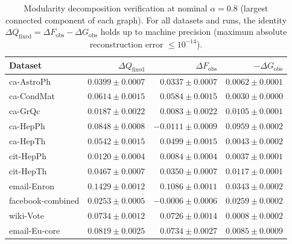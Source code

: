 \begin{table}[t]
\centering
\caption{Modularity decomposition verification at nominal $\alpha = 0.8$ (largest connected component of each graph).
For all datasets and runs, the identity $\Delta Q_{\mathrm{fixed}} = \Delta F_{\mathrm{obs}} - \Delta G_{\mathrm{obs}}$ holds up to machine precision (maximum absolute reconstruction error $\le 10^{-14}$).}
\label{tab:exp1_2_decomposition}
\begin{tabular}{lrrr}
\toprule
Dataset & $\Delta Q_{\mathrm{fixed}}$ & $\Delta F_{\mathrm{obs}}$ & $-\Delta G_{\mathrm{obs}}$  \\
\midrule
ca-AstroPh & $0.0399 \pm 0.0007$ & $0.0337 \pm 0.0007$ & $0.0062 \pm 0.0001$ \\
ca-CondMat & $0.0614 \pm 0.0015$ & $0.0584 \pm 0.0015$ & $0.0030 \pm 0.0000$ \\
ca-GrQc & $0.0187 \pm 0.0022$ & $0.0083 \pm 0.0022$ & $0.0105 \pm 0.0001$ \\
ca-HepPh & $0.0848 \pm 0.0008$ & $-0.0111 \pm 0.0009$ & $0.0959 \pm 0.0002$ \\
ca-HepTh & $0.0542 \pm 0.0015$ & $0.0499 \pm 0.0015$ & $0.0043 \pm 0.0002$ \\
cit-HepPh & $0.0120 \pm 0.0004$ & $0.0084 \pm 0.0004$ & $0.0037 \pm 0.0001$ \\
cit-HepTh & $0.0467 \pm 0.0007$ & $0.0350 \pm 0.0007$ & $0.0117 \pm 0.0001$ \\
email-Enron & $0.1429 \pm 0.0012$ & $0.1086 \pm 0.0011$ & $0.0343 \pm 0.0002$ \\
facebook-combined & $0.0253 \pm 0.0005$ & $-0.0006 \pm 0.0006$ & $0.0259 \pm 0.0002$ \\
wiki-Vote & $0.0734 \pm 0.0012$ & $0.0726 \pm 0.0014$ & $0.0008 \pm 0.0002$ \\
email-Eu-core & $0.0819 \pm 0.0025$ & $0.0734 \pm 0.0027$ & $0.0085 \pm 0.0009$ \\
\bottomrule
\end{tabular}
\end{table}
